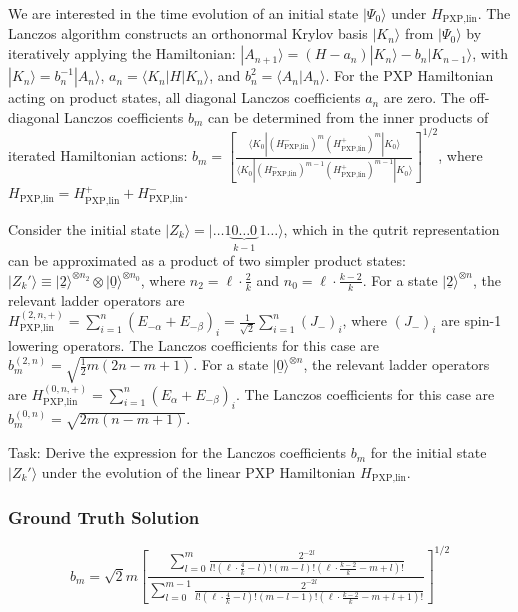 \documentclass[10pt]{article}
\begin{document}
We are interested in the time evolution of an initial state $|\Psi_0\rangle$ under $H_{\text{PXP,lin}}$. The Lanczos algorithm constructs an orthonormal Krylov basis $|K_n\rangle$ from $|\Psi_0\rangle$ by iteratively applying the Hamiltonian: $|A_{n+1}\rangle = (H-a_n)|K_n\rangle - b_n|K_{n-1}\rangle$, with $|K_n\rangle = b_n^{-1}|A_n\rangle$, $a_n = \langle K_n|H|K_n\rangle$, and $b_n^2 = \langle A_n|A_n\rangle$. For the PXP Hamiltonian acting on product states, all diagonal Lanczos coefficients $a_n$ are zero. The off-diagonal Lanczos coefficients $b_m$ can be determined from the inner products of iterated Hamiltonian actions: $b_m = \left[ \frac{ \langle K_0 | (H_{\text{PXP,lin}}^-)^m (H_{\text{PXP,lin}}^+)^m | K_0 \rangle }{ \langle K_0 | (H_{\text{PXP,lin}}^-)^{m-1} (H_{\text{PXP,lin}}^+)^{m-1} | K_0 \rangle } \right]^{1/2}$, where $H_{\text{PXP,lin}} = H_{\text{PXP,lin}}^+ + H_{\text{PXP,lin}}^-$.

Consider the initial state $|Z_k\rangle = |\dots {1}\underbrace{{0}\dots {0}}_{k-1}\,{1}\dots\rangle$, which in the qutrit representation can be approximated as a product of two simpler product states: $|Z_k' \rangle \equiv |\underline{2} \rangle^{\otimes n_2} \otimes |\underline{0} \rangle^{\otimes n_0}$, where $n_2 = \ell \cdot \frac{2}{k}$ and $n_0 = \ell \cdot \frac{k-2}{k}$.
For a state $|\underline{2}\rangle^{\otimes n}$, the relevant ladder operators are $H_{\text{PXP,lin}}^{(2,n,+)} = \sum_{i=1}^n \left( E_{-\alpha} + E_{-\beta} \right)_i = \frac{1}{\sqrt{2}} \sum_{i=1}^n (J_-)_i$, where $(J_-)_i$ are spin-1 lowering operators. The Lanczos coefficients for this case are $b_m^{(2,n)} = \sqrt{\frac{1}{2} m (2n-m+1)}$.
For a state $|\underline{0}\rangle^{\otimes n}$, the relevant ladder operators are $H_{\text{PXP,lin}}^{(0,n,+)} = \sum_{i=1}^n \left( E_{\alpha} + E_{-\beta} \right)_i$. The Lanczos coefficients for this case are $b_m^{(0,n)} = \sqrt{2 m (n-m+1)}$.

Task: Derive the expression for the Lanczos coefficients $b_m$ for the initial state $|Z_k'\rangle$ under the evolution of the linear PXP Hamiltonian $H_{\text{PXP,lin}}$.

\subsubsection*{Ground Truth Solution}
\[ \boxed{b_m = \sqrt{2} m \left[ \frac{\sum_{l=0}^m   \tfrac{2^{-2l}}{l! \left( \ell \cdot \frac{4}{k} -l \right)!(m-l)!\left( \ell \cdot \frac{k-2}{k} -m +l \right)!}}{\sum_{l=0}^{m-1}  \tfrac{2^{-2l}}{l! \left( \ell \cdot \frac{4}{k} -l \right)!(m-l-1)!\left( \ell \cdot \frac{k-2}{k} -m +l +1\right)!}} \right]^{1/2}} \]
\end{document}
